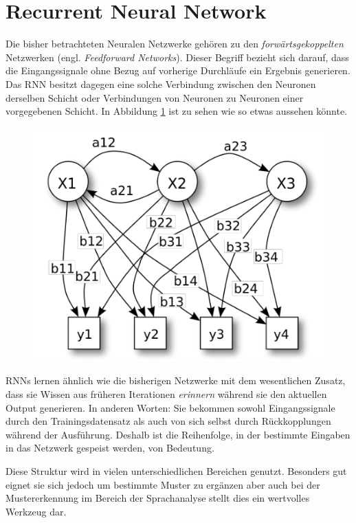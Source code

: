 \section{Recurrent Neural Network}

Die bisher betrachteten Neuralen Netzwerke gehören zu den \emph{forwärtsgekoppelten} Netzwerken (engl. \emph{Feedforward Networks}). Dieser Begriff bezieht sich darauf, dass die Eingangssignale ohne Bezug auf vorherige Durchläufe ein Ergebnis generieren. Das RNN besitzt dagegen eine solche Verbindung zwischen den Neuronen derselben Schicht oder Verbindungen von Neuronen zu Neuronen einer vorgegebenen Schicht. In Abbildung \ref{fig:rnnAufbau} ist zu sehen wie so etwas aussehen könnte. 

\begin{figure}[!htb]
	\centering
	\includegraphics[width=.6\linewidth]{./img/rnn_aufbau}
	\label{fig:rnnAufbau}
\end{figure} 


RNNs lernen ähnlich wie die bisherigen Netzwerke mit dem wesentlichen Zusatz, dass sie Wissen aus früheren Iterationen \emph{erinnern} während sie den aktuellen Output generieren. In anderen Worten: Sie bekommen sowohl Eingangssignale durch den Trainingsdatensatz als auch von sich selbst durch Rückkopplungen während der Ausführung. Deshalb ist die Reihenfolge, in der bestimmte Eingaben in das Netzwerk gespeist werden, von Bedeutung. 

Diese Struktur wird in vielen unterschiedlichen Bereichen genutzt. Besonders gut eignet sie sich jedoch um bestimmte Muster zu ergänzen aber auch bei der Mustererkennung im Bereich der Sprachanalyse stellt dies ein wertvolles Werkzeug dar. 

